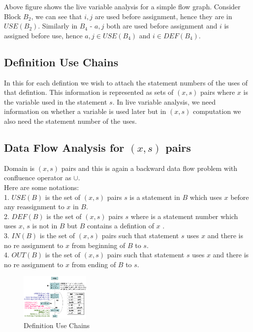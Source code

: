 \documentclass{article}
\begin{document}
Above figure shows the live variable analysis for a simple flow graph. Consider Block $B_2$, we can see that $i,j$ are used before assignment, hence they are in $USE(B_2)$. Similarly in $B_4$ - $a,j$ both are used before assignment and $i$ is assigned before use, hence $a,j \in USE(B_4)$ and $i \in DEF(B_4)$. \\

\subsection*{Definition Use Chains}
In this for each defintion we wish to attach the statement numbers of the uses of that defintion. This information is represented as sets of $(x,s)$ pairs where $x$ is the variable used in the statement $s$. In live variable analysis, we need information on whether a variable is used later but in $(x,s)$ computation we also need the statement number of the uses.

\subsection*{Data Flow Analysis for $(x,s)$ pairs}
Domain is $(x,s)$ pairs and this is again a backward data flow problem with confluence operator as $\cup$. \\ 

Here are some notations: \\
1. $USE(B)$ is the set of $(x,s)$ pairs $s$ is a statement in $B$ which uses $x$ before any reassignment to $x$ in $B$.\\ 
2. $DEF(B)$ is the set of $(x,s)$ pairs $s$ where is a statement number which uses $x$, $s$ is not in $B$ but $B$ contains a defintion of $x$ . \\ 
3. $IN(B)$ is the set of $(x,s)$ pairs such that statement $s$ uses $x$ and there is no re assignment to $x$ from beginning of $B$ to $s$. \\ 
4. $OUT(B)$ is the set of $(x,s)$ pairs such that statement $s$ uses $x$ and there is no re assignment to $x$ from ending of $B$ to $s$. \\

\begin{figure}[h]
    \centering
    \includegraphics[width=0.3\textwidth]{Images/duchain.png}
    \caption{Definition Use Chains}
    \label{fig:DefUse}
\end{figure}
\end{document}
